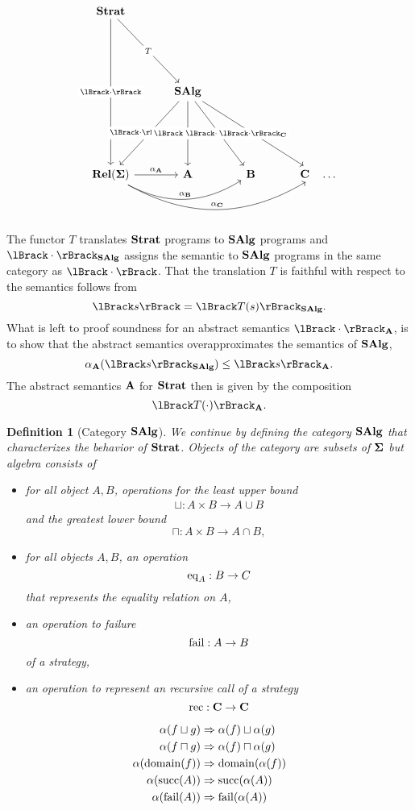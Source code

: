 \documentclass{article}
\newtheorem{definition}[theorem]{Definition}
\begin{document}
\[
\begin{tikzcd}[row sep=2cm,column sep=1.1cm]
 \Strat \arrow{dr}[description]{T} \arrow{dd}[description]{\sem{\cdot}} & & & \\
 & \SAlg \arrow{3-1}[description]{\sem{\cdot}_{\SAlg}} \arrow{3-2}[description]{\sem{\cdot}_{\Cat{A}}} \arrow{3-3}[description]{\sem{\cdot}_{\Cat{B}}} \arrow{3-4}[description]{\sem{\cdot}_{\Cat{C}}} & & \\
 \Rel(\State) \arrow{r}{\alpha_{\Cat{A}}} \ar[rr,bend right,"\alpha_{\Cat{B}}"] \ar[rrr,bend right,"\alpha_{\Cat{C}}"] & \Cat{A} & \Cat{B} & \Cat{C} \quad \ldots
\end{tikzcd}
\]

The functor $T$ translates $\mathbf{Strat}$ programs to $\mathbf{SAlg}$ programs and $\sem{\cdot}_\SAlg$ assigns the semantic to $\mathbf{SAlg}$ programs in the same category as $\sem{\cdot}$. That the translation $T$ is faithful with respect to the semantics follows from \[\sem{s} = \sem{T(s)}_\SAlg.\] What is left to proof soundness for an abstract semantics $\sem{\cdot}_{\Cat{A}}$, is to show that the abstract semantics overapproximates the semantics of $\mathbf{SAlg}$, \[ \alpha_{\Cat{A}}(\sem{s}_\SAlg) \leq \sem{s}_{\Cat{A}}. \] The abstract semantics $\mathbf{A}$ for $\mathbf{Strat}$ then is given by the composition \[ \sem{T(\cdot)}_{\Cat{A}}. \]

\begin{definition}[Category $\mathbf{SAlg}$] \normalfont
  We continue by defining the category $\mathbf{SAlg}$ that characterizes the behavior of $\mathbf{Strat}$. Objects of the category are subsets of $\mathbf{\Sigma}$ but algebra consists of
  \begin{itemize}
    \item for all object $A,B$, operations for the least upper bound \begin{align*} \sqcup : A \times B \rightarrow A \cup B \end{align*} and the greatest lower bound \[ \sqcap : A \times B \rightarrow A \cap B, \]
    \item for all objects $A,B$, an operation \[ \operatorname{eq}_{A} : B \rightarrow C \] that represents the equality relation on $A$,
    \item an operation to failure \[\operatorname{fail} : A \rightarrow B \] of a strategy,
    \item an operation to represent an recursive call of a strategy \[\operatorname{rec} : \mathbf{C} \rightarrow \mathbf{C}\]
  \end{itemize}
  \begin{align*}
    \alpha(f \sqcup g) &\Rightarrow \alpha(f) \sqcup \alpha(g) \\
    \alpha(f \sqcap g) &\Rightarrow \alpha(f) \sqcap \alpha(g) \\
    \alpha(\operatorname{domain}(f)) &\Rightarrow \operatorname{domain}(\alpha(f)) \\
    \alpha(\operatorname{succ}(A)) &\Rightarrow \operatorname{succ}(\alpha(A)) \\
    \alpha(\operatorname{fail}(A)) &\Rightarrow \operatorname{fail}({\alpha(A)}) \\
  \end{align*}
\end{definition}
\end{document}
